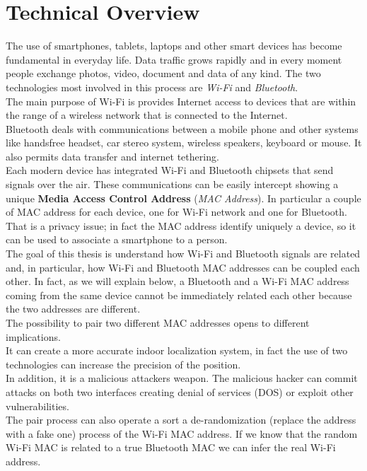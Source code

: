 \chapter{Technical Overview}
\thispagestyle{empty}

The use of smartphones, tablets, laptops and other smart devices has become fundamental in everyday life. Data traffic grows rapidly and in every moment people exchange photos, video, document and data of any kind. The two technologies most involved in this process are \textit{Wi-Fi} and \textit{Bluetooth}.\\
The main purpose of Wi-Fi is provides Internet access to devices that are within the range of a wireless network that is connected to the Internet.\\
Bluetooth deals with communications between a mobile phone and other systems like handsfree headset, car stereo system, wireless speakers, keyboard or mouse. It also permits data transfer and internet tethering.\\
\linebreak
Each modern device has integrated Wi-Fi and Bluetooth chipsets that send signals over the air. These communications can be easily intercept showing a unique \textbf{Media Access Control Address} (\textit{MAC Address}). In particular a couple of MAC address for each device, one for Wi-Fi network and one for Bluetooth. \\
That is a privacy issue; in fact the MAC address identify uniquely a device, so it can be used to associate a smartphone to a person.\\
\linebreak
The goal of this thesis is understand how Wi-Fi and Bluetooth signals are related and, in particular, how Wi-Fi and Bluetooth MAC addresses can be coupled each other. In fact, as we will explain below, a Bluetooth and a Wi-Fi MAC address coming from the same device cannot be immediately related each other because the two addresses are different.\\
\linebreak
The possibility to pair two different MAC addresses opens to different implications.\\
It can create a more accurate indoor localization system, in fact the use of two technologies can increase the precision of the position.\\
In addition, it is a malicious attackers weapon. The malicious hacker can commit attacks on both two interfaces creating denial of services (DOS) or exploit other vulnerabilities.\\
The pair process can also operate a sort a de-randomization (replace the address with a fake one) process of the Wi-Fi MAC address. If we know that the random Wi-Fi MAC is related to a true Bluetooth MAC we can infer the real Wi-Fi address.

